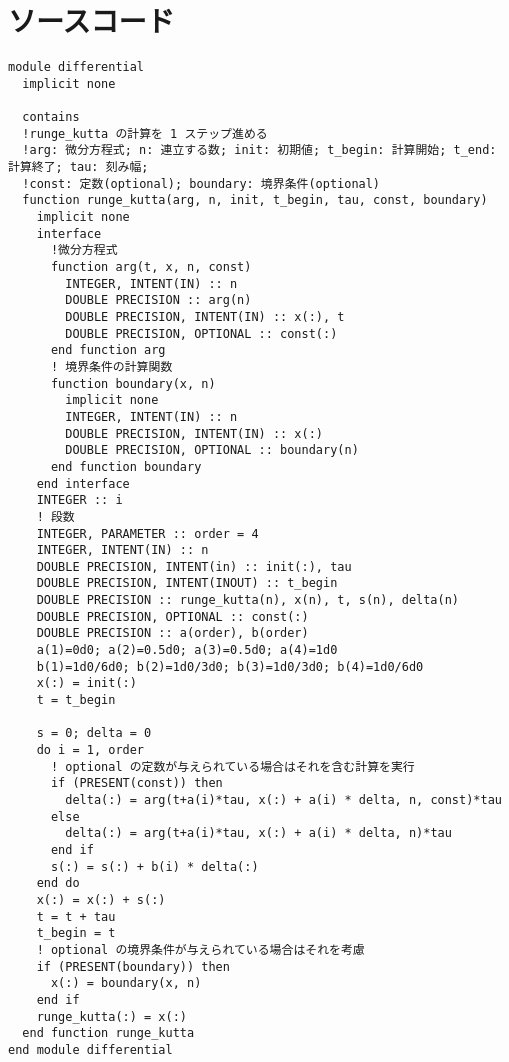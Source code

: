 \appendix
\def\thesection{補遺\Alph{section}}
\renewcommand*{\thelstlisting}{\Alph{section}.\arabic{lstlisting}}
\section{ソースコード}
\begin{lstlisting}[caption=Runge-Kutta関数のソースコード,label=srcRK4]
module differential
  implicit none
    
  contains
  !runge_kutta の計算を 1 ステップ進める
  !arg: 微分方程式; n: 連立する数; init: 初期値; t_begin: 計算開始; t_end: 計算終了; tau: 刻み幅;
  !const: 定数(optional); boundary: 境界条件(optional)
  function runge_kutta(arg, n, init, t_begin, tau, const, boundary)
    implicit none
    interface
      !微分方程式
      function arg(t, x, n, const)
        INTEGER, INTENT(IN) :: n
        DOUBLE PRECISION :: arg(n)
        DOUBLE PRECISION, INTENT(IN) :: x(:), t
        DOUBLE PRECISION, OPTIONAL :: const(:)
      end function arg
      ! 境界条件の計算関数
      function boundary(x, n)
        implicit none
        INTEGER, INTENT(IN) :: n
        DOUBLE PRECISION, INTENT(IN) :: x(:)
        DOUBLE PRECISION, OPTIONAL :: boundary(n)
      end function boundary
    end interface
    INTEGER :: i
    ! 段数
    INTEGER, PARAMETER :: order = 4
    INTEGER, INTENT(IN) :: n
    DOUBLE PRECISION, INTENT(in) :: init(:), tau
    DOUBLE PRECISION, INTENT(INOUT) :: t_begin
    DOUBLE PRECISION :: runge_kutta(n), x(n), t, s(n), delta(n)
    DOUBLE PRECISION, OPTIONAL :: const(:)
    DOUBLE PRECISION :: a(order), b(order)
    a(1)=0d0; a(2)=0.5d0; a(3)=0.5d0; a(4)=1d0
    b(1)=1d0/6d0; b(2)=1d0/3d0; b(3)=1d0/3d0; b(4)=1d0/6d0
    x(:) = init(:)
    t = t_begin

    s = 0; delta = 0
    do i = 1, order
      ! optional の定数が与えられている場合はそれを含む計算を実行
      if (PRESENT(const)) then 
        delta(:) = arg(t+a(i)*tau, x(:) + a(i) * delta, n, const)*tau
      else
        delta(:) = arg(t+a(i)*tau, x(:) + a(i) * delta, n)*tau
      end if
      s(:) = s(:) + b(i) * delta(:)
    end do
    x(:) = x(:) + s(:)
    t = t + tau
    t_begin = t
    ! optional の境界条件が与えられている場合はそれを考慮
    if (PRESENT(boundary)) then
      x(:) = boundary(x, n)
    end if
    runge_kutta(:) = x(:)
  end function runge_kutta
end module differential
\end{lstlisting}
\newpage
